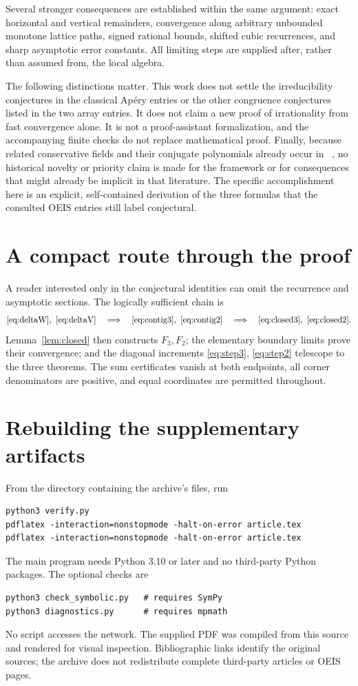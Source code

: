 \documentclass[11pt]{article}
\numberwithin{equation}{section}
\theoremstyle{definition}
\theoremstyle{remark}
\newcommand{\Apery}{Ap\'ery}
\begin{document}
Several stronger consequences are established within the same argument:
exact horizontal and vertical remainders, convergence along arbitrary
unbounded monotone lattice paths, signed rational bounds, shifted cubic
recurrences, and sharp asymptotic error constants. All limiting steps
are supplied after, rather than assumed from, the local algebra.

The following distinctions matter. This work does not settle the
irreducibility conjectures in the classical \Apery{} entries or the
other congruence conjectures listed in the two array entries. It does
not claim a new proof of irrationality from fast convergence alone.
It is not a proof-assistant formalization, and the accompanying finite
checks do not replace mathematical proof. Finally, because related
conservative fields and their conjugate polynomials already occur in
~\cite{david}, no historical novelty or priority claim is made for the
framework or for consequences that might already be implicit in that
literature. The specific accomplishment here is an explicit,
self-contained derivation of the three formulas that the consulted
OEIS entries still label conjectural.

\appendix
\section{A compact route through the proof}
A reader interested only in the conjectural identities can omit the
recurrence and asymptotic sections. The logically sufficient chain is
\[
 \eqref{eq:deltaW},\ \eqref{eq:deltaV}
 \quad\Longrightarrow\quad
 \eqref{eq:contig3},\ \eqref{eq:contig2}
 \quad\Longrightarrow\quad
 \eqref{eq:closed3},\ \eqref{eq:closed2}.
\]
Lemma~\ref{lem:closed} then constructs $F_3,F_2$; the elementary boundary
limits prove their convergence; and the diagonal increments
\eqref{eq:step3}, \eqref{eq:step2} telescope to the three theorems.
The sum certificates vanish at both endpoints, all corner denominators
are positive, and equal coordinates are permitted throughout.

\section{Rebuilding the supplementary artifacts}
From the directory containing the archive's files, run
\begin{verbatim}
python3 verify.py
pdflatex -interaction=nonstopmode -halt-on-error article.tex
pdflatex -interaction=nonstopmode -halt-on-error article.tex
\end{verbatim}
The main program needs Python 3.10 or later and no third-party Python
packages. The optional checks are
\begin{verbatim}
python3 check_symbolic.py   # requires SymPy
python3 diagnostics.py      # requires mpmath
\end{verbatim}
No script accesses the network. The supplied PDF was compiled from
this source and rendered for visual inspection. Bibliographic links
identify the original sources; the archive does not redistribute
complete third-party articles or OEIS pages.
\end{document}
